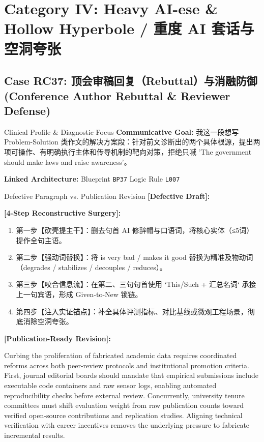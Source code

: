 \section{Category IV: Heavy AI-ese \& Hollow Hyperbole / 重度 AI 套话与空洞夸张}
\subsection{Case RC37: 顶会审稿回复（Rebuttal）与消融防御 (Conference Author Rebuttal \& Reviewer Defense)}\label{case:RC37}
\begin{ConceptBox}{Clinical Profile \& Diagnostic Focus}
\textbf{Communicative Goal:} 我这一段想写 Problem-Solution 类作文的解决方案段：针对前文诊断出的两个具体根源，提出两项可操作、有明确执行主体和传导机制的靶向对策，拒绝只喊 'The government should make laws and raise awareness'。\par
\textbf{Linked Architecture:} Blueprint \texttt{BP37} \enspace\textbar\enspace Logic Rule \texttt{L007}
\end{ConceptBox}
\begin{ExampleBox}{Defective Paragraph vs. Publication Revision}
\textbf{\color{TargetHighlight}[Defective Draft]:}\par
{}\par\vspace{6pt}
\textbf{\color{AcadForest}[4-Step Reconstructive Surgery]:}
\begin{enumerate}[label=\textbf{\color{AcadNavy}Step \arabic*:}, leftmargin=2em]
  \item 第一步【砍壳提主干】：删去句首 AI 修辞帽与口语词，将核心实体（≤5词）提作全句主语。
  \item 第二步【强动词替换】：将 is very bad / makes it good 替换为精准及物动词（degrades / stabilizes / decouples / reduces）。
  \item 第三步【咬合信息流】：在第二、三句句首使用 `This/Such + 汇总名词` 承接上一句宾语，形成 Given-to-New 锁链。
  \item 第四步【注入实证锚点】：补全具体评测指标、对比基线或微观工程场景，彻底消除空洞夸张。
\end{enumerate}\vspace{4pt}
\textbf{\color{AcadNavy}[Publication-Ready Revision]:}\par
Curbing the proliferation of fabricated academic data requires coordinated reforms across both peer-review protocols and institutional promotion criteria. First, journal editorial boards should mandate that empirical submissions include executable code containers and raw sensor logs, enabling automated reproducibility checks before external review. Concurrently, university tenure committees must shift evaluation weight from raw publication counts toward verified open-source contributions and replication studies. Aligning technical verification with career incentives removes the underlying pressure to fabricate incremental results.
\end{ExampleBox}
